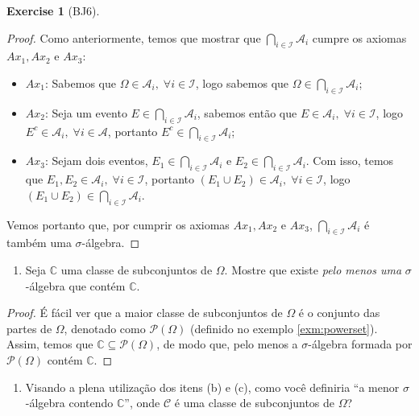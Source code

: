 \documentclass[
]{article}
\providecommand{\tightlist}{%
  \setlength{\itemsep}{0pt}\setlength{\parskip}{0pt}}
\theoremstyle{definition}
\theoremstyle{definition}
\theoremstyle{definition}
\newtheorem{exercise}{Exercise}[section]
\theoremstyle{definition}
\theoremstyle{remark}
\begin{document}
\begin{exercise}[BJ6]
\begin{proof}
Como anteriormente, temos que mostrar que \(\bigcap_{i \in \mathcal{I}}\mathcal{A}_{i}\) cumpre os axiomas \(Ax_{1}, Ax_{2}\) e \(Ax_{3}\):

\begin{itemize}
\tightlist
\item
  \(Ax_{1}\): Sabemos que \(\Omega \in \mathcal{A}_{i}, \; \forall i \in \mathcal{I}\), logo sabemos que \(\Omega \in \bigcap_{i \in \mathcal{I}}\mathcal{A}_{i}\);
\item
  \(Ax_{2}\): Seja um evento \(E \in \bigcap_{i \in \mathcal{I}}\mathcal{A}_{i}\), sabemos então que \(E \in \mathcal{A}_{i}, \; \forall i \in \mathcal{I}\), logo \(E^{c} \in \mathcal{A}_{i}, \; \forall i \in \mathcal{A}\), portanto \(E^{c} \in \bigcap_{i \in \mathcal{I}}\mathcal{A}_{i}\);
\item
  \(Ax_{3}\): Sejam dois eventos, \(E_{1} \in \bigcap_{i \in \mathcal{I}}\mathcal{A}_{i}\) e \(E_{2} \in \bigcap_{i \in \mathcal{I}}\mathcal{A}_{i}\). Com isso, temos que \(E_{1}, E_{2} \in \mathcal{A}_{i}, \; \forall i \in \mathcal{I}\), portanto \((E_{1} \cup E_{2}) \in \mathcal{A}_{i}, \; \forall i \in \mathcal{I}\), logo \((E_{1} \cup E_{2}) \in \bigcap_{i \in \mathcal{I}}\mathcal{A}_{i}\).
\end{itemize}

Vemos portanto que, por cumprir os axiomas \(Ax_{1}, Ax_{2}\) e \(Ax_{3}\), \(\bigcap_{i \in \mathcal{I}}\mathcal{A}_{i}\) é também uma \(\sigma\)-álgebra.
\end{proof}

\begin{enumerate}
\def\labelenumi{\alph{enumi})}
\setcounter{enumi}{2}
\tightlist
\item
  Seja \(\mathbb{C}\) uma classe de subconjuntos de \(\Omega\). Mostre que existe \emph{pelo menos uma} \(\sigma\)-álgebra que contém \(\mathbb{C}\).
\end{enumerate}

\begin{proof}
É fácil ver que a maior classe de subconjuntos de \(\Omega\) é o conjunto das partes de \(\Omega\), denotado como \(\mathcal{P}(\Omega)\) (definido no exemplo \ref{exm:powerset}). Assim, temos que \(\mathbb{C} \subseteq \mathcal{P}(\Omega)\), de modo que, pelo menos a \(\sigma\)-álgebra formada por \(\mathcal{P}(\Omega)\) contém \(\mathbb{C}\).
\end{proof}

\begin{enumerate}
\def\labelenumi{\alph{enumi})}
\setcounter{enumi}{3}
\tightlist
\item
  Visando a plena utilização dos itens (b) e (c), como você definiria ``a menor \(\sigma\)-álgebra contendo \(\mathbb{C}\)'', onde \(\mathcal{C}\) é uma classe de subconjuntos de \(\Omega\)?
\end{enumerate}


\end{exercise}
\end{document}
